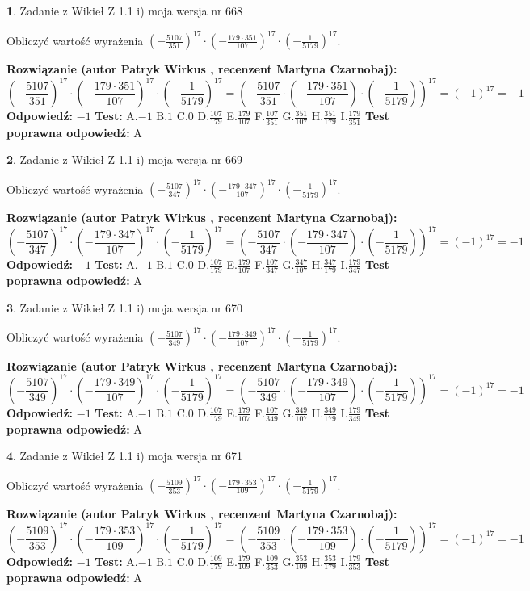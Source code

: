 \documentclass[12pt, a4paper]{article}
\theoremstyle{definition} %
\newtheorem{zad}{}
\newcommand{\zadStart}[1]{\begin{zad}#1\newline}
\newcommand{\zadStop}{\end{zad}}
\newcommand{\rozwStart}[2]{\noindent \textbf{Rozwiązanie (autor #1 , recenzent #2): }\newline}
\newcommand{\rozwStop}{\newline}
\newcommand{\odpStart}{\noindent \textbf{Odpowiedź:}\newline}
\newcommand{\odpStop}{\newline}
\newcommand{\testStart}{\noindent \textbf{Test:}\newline}
\newcommand{\testStop}{\newline}
\newcommand{\kluczStart}{\noindent \textbf{Test poprawna odpowiedź:}\newline}
\newcommand{\kluczStop}{\newline}
\begin{document}
\zadStart{Zadanie z Wikieł Z 1.1 i) moja wersja nr 668}

Obliczyć wartość wyrażenia $(-\frac{5107}{351})^{17} \cdot (-\frac{179 \cdot 351}{107})^{17} \cdot (-\frac{1}{5179})^{17}$.
\zadStop
\rozwStart{Patryk Wirkus}{Martyna Czarnobaj}
$$(-\frac{5107}{351})^{17} \cdot (-\frac{179 \cdot 351}{107})^{17} \cdot (-\frac{1}{5179})^{17} = (-\frac{5107}{351} \cdot (-\frac{179 \cdot 351}{107}) \cdot (-\frac{1}{5179}))^{17} = (-1)^{17} = -1$$
\rozwStop
\odpStart
$-1$
\odpStop
\testStart
A.$-1$ B.$1$ C.$0$ D.$\frac{107}{179}$ E.$\frac{179}{107}$
F.$\frac{107}{351}$ G.$\frac{351}{107}$
H.$\frac{351}{179}$
I.$\frac{179}{351}$
\testStop
\kluczStart
A
\kluczStop



\zadStart{Zadanie z Wikieł Z 1.1 i) moja wersja nr 669}

Obliczyć wartość wyrażenia $(-\frac{5107}{347})^{17} \cdot (-\frac{179 \cdot 347}{107})^{17} \cdot (-\frac{1}{5179})^{17}$.
\zadStop
\rozwStart{Patryk Wirkus}{Martyna Czarnobaj}
$$(-\frac{5107}{347})^{17} \cdot (-\frac{179 \cdot 347}{107})^{17} \cdot (-\frac{1}{5179})^{17} = (-\frac{5107}{347} \cdot (-\frac{179 \cdot 347}{107}) \cdot (-\frac{1}{5179}))^{17} = (-1)^{17} = -1$$
\rozwStop
\odpStart
$-1$
\odpStop
\testStart
A.$-1$ B.$1$ C.$0$ D.$\frac{107}{179}$ E.$\frac{179}{107}$
F.$\frac{107}{347}$ G.$\frac{347}{107}$
H.$\frac{347}{179}$
I.$\frac{179}{347}$
\testStop
\kluczStart
A
\kluczStop



\zadStart{Zadanie z Wikieł Z 1.1 i) moja wersja nr 670}

Obliczyć wartość wyrażenia $(-\frac{5107}{349})^{17} \cdot (-\frac{179 \cdot 349}{107})^{17} \cdot (-\frac{1}{5179})^{17}$.
\zadStop
\rozwStart{Patryk Wirkus}{Martyna Czarnobaj}
$$(-\frac{5107}{349})^{17} \cdot (-\frac{179 \cdot 349}{107})^{17} \cdot (-\frac{1}{5179})^{17} = (-\frac{5107}{349} \cdot (-\frac{179 \cdot 349}{107}) \cdot (-\frac{1}{5179}))^{17} = (-1)^{17} = -1$$
\rozwStop
\odpStart
$-1$
\odpStop
\testStart
A.$-1$ B.$1$ C.$0$ D.$\frac{107}{179}$ E.$\frac{179}{107}$
F.$\frac{107}{349}$ G.$\frac{349}{107}$
H.$\frac{349}{179}$
I.$\frac{179}{349}$
\testStop
\kluczStart
A
\kluczStop



\zadStart{Zadanie z Wikieł Z 1.1 i) moja wersja nr 671}

Obliczyć wartość wyrażenia $(-\frac{5109}{353})^{17} \cdot (-\frac{179 \cdot 353}{109})^{17} \cdot (-\frac{1}{5179})^{17}$.
\zadStop
\rozwStart{Patryk Wirkus}{Martyna Czarnobaj}
$$(-\frac{5109}{353})^{17} \cdot (-\frac{179 \cdot 353}{109})^{17} \cdot (-\frac{1}{5179})^{17} = (-\frac{5109}{353} \cdot (-\frac{179 \cdot 353}{109}) \cdot (-\frac{1}{5179}))^{17} = (-1)^{17} = -1$$
\rozwStop
\odpStart
$-1$
\odpStop
\testStart
A.$-1$ B.$1$ C.$0$ D.$\frac{109}{179}$ E.$\frac{179}{109}$
F.$\frac{109}{353}$ G.$\frac{353}{109}$
H.$\frac{353}{179}$
I.$\frac{179}{353}$
\testStop
\kluczStart
A
\kluczStop
\end{document}
